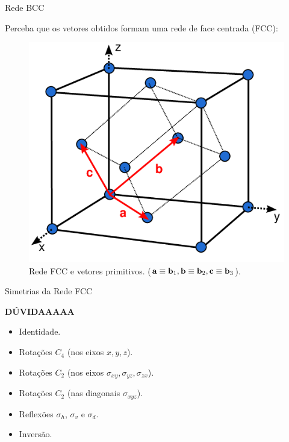 \documentclass[aspectratio=169]{beamer}
\begin{document}


\begin{frame}{Rede BCC}

Perceba que os vetores obtidos formam uma rede de face centrada (FCC):
\begin{figure}[H]
\centering
\includegraphics[width=0.4\linewidth]{fig/fcc.png}
\caption{Rede FCC e vetores primitivos. ($\vb{a} \equiv \vb{b}_1, \vb{b} \equiv \vb{b}_2, \vb{c} \equiv \vb{b}_3$).}
\label{fig:fcc}
\end{figure}

\end{frame}




\begin{frame}{Simetrias da Rede FCC}

\textbf{DÚVIDAAAAA}

\begin{itemize}
\item Identidade.
\n\n
\item Rotações $C_4$ (nos eixos $x, y, z$).
\n\n
\item Rotações $C_2$ (nos eixos $\sigma_{xy}, \sigma_{yz}, \sigma_{zx}$).
\n\n
\item Rotações $C_2$ (nas diagonais $\sigma_{xyz}$).
\n\n
\item Reflexões $\sigma_h$, $\sigma_v$ e $\sigma_d$.
\n\n
\item Inversão.
\end{itemize}

\end{frame}


\end{document}
